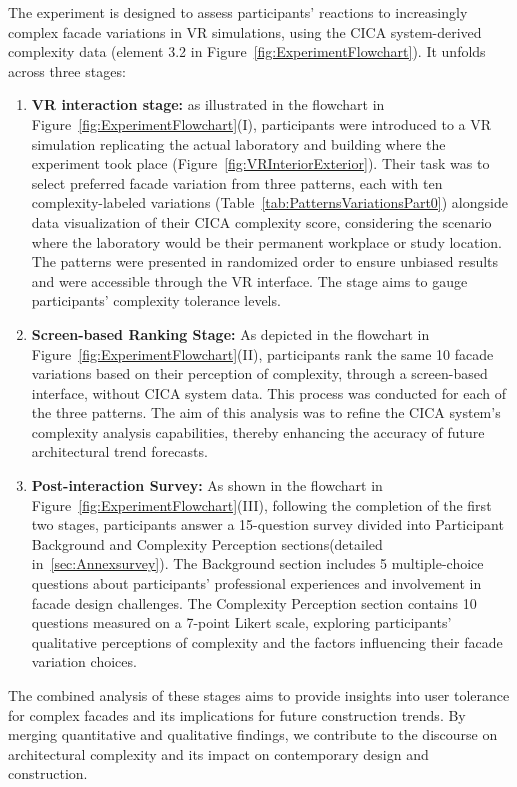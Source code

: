 %    


The experiment is designed to assess participants' reactions to increasingly complex facade variations in VR simulations, using the CICA system-derived complexity data (element 3.2 in Figure~\ref{fig:ExperimentFlowchart}). It unfolds across three stages:

\begin{enumerate}
    \item \textbf{VR interaction stage:}  as illustrated in the flowchart in Figure~\ref{fig:ExperimentFlowchart}(I), participants were introduced to a VR simulation replicating the actual laboratory and building where the experiment took place (Figure~\ref{fig:VRInteriorExterior}).
    Their task was to select preferred facade variation from three patterns, each with ten complexity-labeled variations (Table~\ref{tab:PatternsVariationsPart0}) alongside data visualization of their CICA complexity score, considering the scenario where the laboratory would be their permanent workplace or study location.
    The patterns were presented in randomized order to ensure unbiased results and were accessible through the VR interface.
    The stage aims to gauge participants' complexity tolerance levels.
    \item \textbf{Screen-based Ranking Stage:} As depicted in the flowchart in Figure~\ref{fig:ExperimentFlowchart}(II), participants rank the same 10 facade variations based on their perception of complexity, through a screen-based interface, without CICA system data.
    This process was conducted for each of the three patterns.
    The aim of this analysis was to refine the CICA system's complexity analysis capabilities, thereby enhancing the accuracy of future architectural trend forecasts.
    \item \textbf{Post-interaction Survey:} As shown in the flowchart in Figure~\ref{fig:ExperimentFlowchart}(III), following the completion of the first two stages, participants answer a 15-question survey divided into Participant Background and Complexity Perception sections(detailed in~\ref{sec:Annexsurvey}).
    The Background section includes 5 multiple-choice questions about participants' professional experiences and involvement in facade design challenges.
    The Complexity Perception section contains 10 questions measured on a 7-point Likert scale, exploring participants' qualitative perceptions of complexity and the factors influencing their facade variation choices.
\end{enumerate}


The combined analysis of these stages aims to provide insights into user tolerance for complex facades and its implications for future construction trends.
By merging quantitative and qualitative findings, we contribute to the discourse on architectural complexity and its impact on contemporary design and construction.